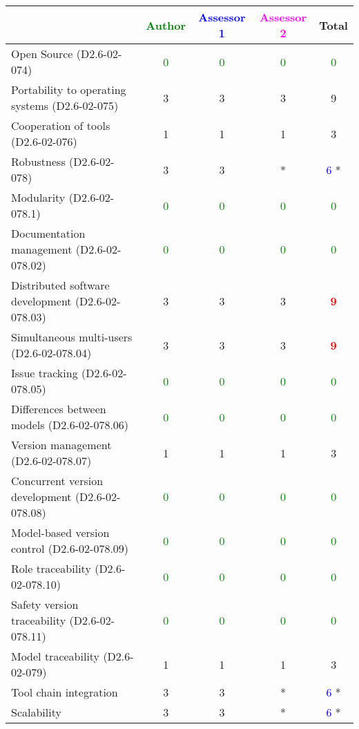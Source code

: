 \begin{tabular}{|l | c | c | c | c|}
\hline
& \textcolor{green}{Author} & \textcolor{blue}{Assessor 1} & \textcolor{magenta}{Assessor 2} & Total \\
\hline 
Open Source (D2.6-02-074) & \textcolor{green}{0}   & \textcolor{green}{0}   & \textcolor{green}{0} & \textcolor{green}{0}  \\
\hline 
Portability to operating systems (D2.6-02-075) &3 &3 & 3   &  9 \\
\hline
Cooperation of tools (D2.6-02-076) &1 &1 & 1   & 3    \\
\hline
Robustness (D2.6-02-078) &3 &3 & *& \textcolor{blue}{6} * \\
\hline
Modularity (D2.6-02-078.1) & \textcolor{green}{0}   & \textcolor{green}{0}   & \textcolor{green}{0} & \textcolor{green}{0} \\
\hline
Documentation management (D2.6-02-078.02) & \textcolor{green}{0}   & \textcolor{green}{0}   & \textcolor{green}{0} & \textcolor{green}{0} \\
\hline
Distributed software development (D2.6-02-078.03)  &3 &3 & 3   & \textcolor{red}{\textbf{9}} \\
\hline
Simultaneous multi-users (D2.6-02-078.04)   &3 &3 & 3   & \textcolor{red}{\textbf{9}} \\
\hline
Issue tracking (D2.6-02-078.05) & \textcolor{green}{0}   & \textcolor{green}{0}   & \textcolor{green}{0} & \textcolor{green}{0} \\
\hline
Differences between models (D2.6-02-078.06) & \textcolor{green}{0}   & \textcolor{green}{0}   & \textcolor{green}{0} & \textcolor{green}{0} \\
\hline
Version management (D2.6-02-078.07) &1 &1 & 1   & 3    \\
\hline
Concurrent version development (D2.6-02-078.08) & \textcolor{green}{0}   & \textcolor{green}{0}   & \textcolor{green}{0} & \textcolor{green}{0} \\
\hline
Model-based version control (D2.6-02-078.09) & \textcolor{green}{0}   & \textcolor{green}{0}   & \textcolor{green}{0} & \textcolor{green}{0} \\
\hline
Role traceability (D2.6-02-078.10) & \textcolor{green}{0}   & \textcolor{green}{0}   & \textcolor{green}{0} & \textcolor{green}{0} \\
\hline
Safety version traceability (D2.6-02-078.11) & \textcolor{green}{0}   & \textcolor{green}{0}   & \textcolor{green}{0} & \textcolor{green}{0} \\
\hline
Model traceability (D2.6-02-079) &1 &1 & 1   & 3    \\
\hline
Tool chain integration &3 &3 & *& \textcolor{blue}{6} * \\
\hline
Scalability &3 &3 & * & \textcolor{blue}{6} *\\
\hline
\end{tabular}

